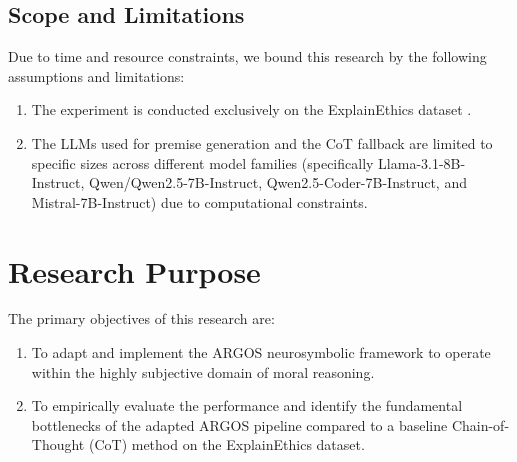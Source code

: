 \subsection{Scope and Limitations}
\label{sec:batasanMasalah}
Due to time and resource constraints, we bound this research by the following assumptions and limitations:
\begin{enumerate}
	\item The experiment is conducted exclusively on the ExplainEthics dataset \citep{quan-etal-2024-enhancing}.
	\item The LLMs used for premise generation and the CoT fallback are limited to specific sizes across different model families (specifically Llama-3.1-8B-Instruct, Qwen/Qwen2.5-7B-Instruct, Qwen2.5-Coder-7B-Instruct, and Mistral-7B-Instruct) due to computational constraints.
\end{enumerate}

\section{Research Purpose}
\label{sec:tujuan}
The primary objectives of this research are:
\begin{enumerate}
	\item To adapt and implement the ARGOS neurosymbolic framework to operate within the highly subjective domain of moral reasoning.
	\item To empirically evaluate the performance and identify the fundamental bottlenecks of the adapted ARGOS pipeline compared to a baseline Chain-of-Thought (CoT) method on the ExplainEthics dataset.
\end{enumerate}

